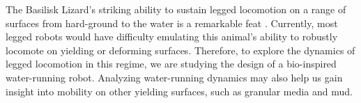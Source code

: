 The Basilisk Lizard's striking ability to sustain legged locomotion on a range of surfaces from hard-ground to the water is a remarkable feat \cite{glasheen1996hydrodynamic}. Currently, most legged robots would have difficulty emulating this animal's ability to robustly locomote on yielding or deforming surfaces. Therefore, to explore the dynamics of legged locomotion in this regime, we are studying the design of a bio-inspired water-running robot. Analyzing water-running dynamics may also help us gain insight into mobility on other yielding surfaces, such as granular media and mud.
